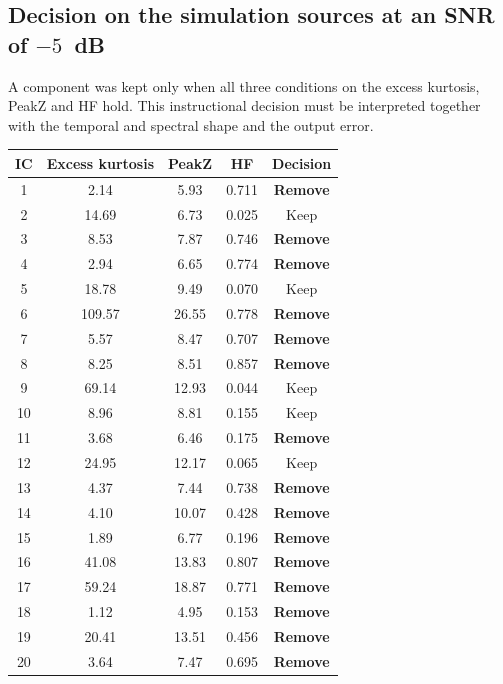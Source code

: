 \clearpage
\subsection*{Decision on the simulation sources at an SNR of $-5$~dB}
A component was kept only when all three conditions on the excess kurtosis, PeakZ and HF hold. This instructional decision must be interpreted together with the temporal and spectral shape and the output error.
\begin{center}
\small
\begin{longtable}{@{}ccccc@{}}
\toprule
\textbf{IC} & \textbf{Excess kurtosis} & \textbf{PeakZ} & \textbf{HF} & \textbf{Decision}\\
\midrule
\endhead
1 & 2.14 & 5.93 & 0.711 & \textcolor{accent}{\textbf{Remove}}\\
2 & 14.69 & 6.73 & 0.025 & Keep\\
3 & 8.53 & 7.87 & 0.746 & \textcolor{accent}{\textbf{Remove}}\\
4 & 2.94 & 6.65 & 0.774 & \textcolor{accent}{\textbf{Remove}}\\
5 & 18.78 & 9.49 & 0.070 & Keep\\
6 & 109.57 & 26.55 & 0.778 & \textcolor{accent}{\textbf{Remove}}\\
7 & 5.57 & 8.47 & 0.707 & \textcolor{accent}{\textbf{Remove}}\\
8 & 8.25 & 8.51 & 0.857 & \textcolor{accent}{\textbf{Remove}}\\
9 & 69.14 & 12.93 & 0.044 & Keep\\
10 & 8.96 & 8.81 & 0.155 & Keep\\
11 & 3.68 & 6.46 & 0.175 & \textcolor{accent}{\textbf{Remove}}\\
12 & 24.95 & 12.17 & 0.065 & Keep\\
13 & 4.37 & 7.44 & 0.738 & \textcolor{accent}{\textbf{Remove}}\\
14 & 4.10 & 10.07 & 0.428 & \textcolor{accent}{\textbf{Remove}}\\
15 & 1.89 & 6.77 & 0.196 & \textcolor{accent}{\textbf{Remove}}\\
16 & 41.08 & 13.83 & 0.807 & \textcolor{accent}{\textbf{Remove}}\\
17 & 59.24 & 18.87 & 0.771 & \textcolor{accent}{\textbf{Remove}}\\
18 & 1.12 & 4.95 & 0.153 & \textcolor{accent}{\textbf{Remove}}\\
19 & 20.41 & 13.51 & 0.456 & \textcolor{accent}{\textbf{Remove}}\\
20 & 3.64 & 7.47 & 0.695 & \textcolor{accent}{\textbf{Remove}}\\

\end{longtable}
\end{center}
